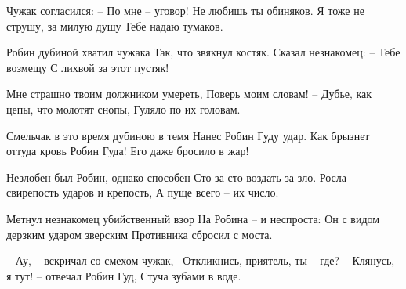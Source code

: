 \begin{flushleft}
Чужак согласился: – По мне – уговор! \linebreak
Не любишь ты обиняков. \linebreak
Я тоже не струшу, за милую душу \linebreak
Тебе надаю тумаков. \linebreak

Робин дубиной хватил чужака \linebreak
Так, что звякнул костяк. \linebreak
Сказал незнакомец: – Тебе возмещу \linebreak
С лихвой за этот пустяк! \linebreak

Мне страшно твоим должником умереть, \linebreak
Поверь моим словам! – \linebreak
Дубье, как цепы, что молотят снопы, \linebreak
Гуляло по их головам. \linebreak

Смельчак в это время дубиною в темя \linebreak
Нанес Робин Гуду удар. \linebreak
Как брызнет оттуда кровь Робин Гуда! \linebreak
Его даже бросило в жар! \linebreak

\newpage

Незлобен был Робин, однако способен \linebreak
Сто за сто воздать за зло. \linebreak
Росла свирепость ударов и крепость, \linebreak
А пуще всего – их число. \linebreak

Метнул незнакомец убийственный взор \linebreak
На Робина – и неспроста: \linebreak
Он с видом дерзким ударом зверским \linebreak
Противника сбросил с моста. \linebreak

– Ау, – вскричал со смехом чужак,– \linebreak
Откликнись, приятель, ты – где? \linebreak
– Клянусь, я тут! – отвечал Робин Гуд, \linebreak
Стуча зубами в воде. \linebreak


\end{flushleft}
